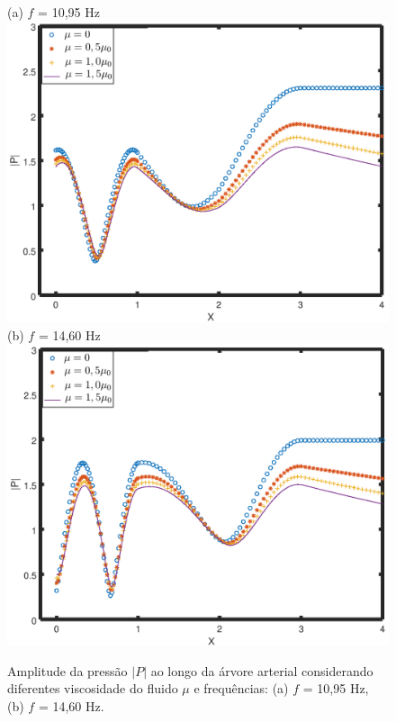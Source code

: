 \documentclass[
        english,			
        brazil			        %
        ,<...>]{abntbibufjf}
\begin{document}
\begin{figure}[!htbp]
	\centering
	(a) $f$ = 10,95 Hz\\
	\includegraphics[scale=0.7]{figure3-result/Figure3_f_10_95_new.png}\\
	(b) $f$ = 14,60 Hz\\
	\includegraphics[scale=0.7]{figure3-result/Figure3_f_14_60_new.png}\\
	\caption{Amplitude da pressão $|P|$ ao longo da árvore arterial considerando diferentes viscosidade do fluido $\mu$ e frequências: (a) $f$ = 10,95 Hz, (b)  $f$ = 14,60 Hz. }
	\label{fig3b:arterial-tree}%
\end{figure}
\end{document}

